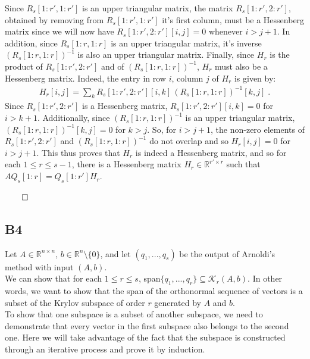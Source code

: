 \documentclass[a4paper,10pt]{article}
\begin{document}
Since $R_s[1:r',1:r']$ is an upper triangular matrix, the matrix $R_s[1:r',2:r']$, obtained by removing from $R_s[1:r',1:r']$ it's first column, must be a Hessenberg matrix since we will now have $R_s[1:r',2:r'][i,j] = 0$ whenever $i > j + 1$. In addition, since $R_s[1:r,1:r]$ is an upper triangular matrix, it's inverse $(R_s[1:r,1:r])^{-1}$ is also an upper triangular matrix. Finally, since $H_r$ is the product of $R_s[1:r',2:r']$ and of $(R_s[1:r,1:r])^{-1}$, $H_r$ must also be a Hessenberg matrix. Indeed, the entry in row $i$, column $j$ of $H_r$ is given by:
\begin{align*}
    H_r[i,j] = \sum_k R_s[1:r',2:r'][i,k] \, (R_s[1:r,1:r])^{-1}[k,j] \; .
\end{align*} 
Since $R_s[1:r',2:r']$ is a Hessenberg matrix, $R_s[1:r',2:r'][i,k] = 0$ for $i > k+1$. Additionally, since $(R_s[1:r,1:r])^{-1}$ is an upper triangular matrix, $(R_s[1:r,1:r])^{-1}[k,j] = 0$ for $k > j$. So, for $i > j+1$, the non-zero elements of $R_s[1:r',2:r']$ and $(R_s[1:r,1:r])^{-1}$ do not overlap and so $H_r[i,j] = 0$ for $i > j+1$. This thus proves that $H_r$ is indeed a Hessenberg matrix, and so for each $1 \leq r \leq s-1$, there is a Hessenberg matrix $H_r \in \mathbb{R}^{r' \times r}$ such that $A Q_s[1:r] = Q_s[1:r'] H_r$.
\begin{flushright}
    $\qed$
\end{flushright}


\subsection*{B4}
Let $A \in \mathbb{R}^{n \times n}$, $b \in \mathbb{R}^n \setminus \{0\}$, and let $(q_1,...,q_s)$ be the output of Arnoldi's method with input $(A,b)$.\\
We can show that for each $1\leq r \leq s$, span$\{q_1,...,q_r\} \subseteq \mathcal{K}_r(A,b)$. In other words, we want to show that the span of the orthonormal sequence of vectors is a subset of the Krylov subspace of order $r$ generated by $A$ and $b$.\\

To show that one subspace is a subset of another subspace, we need to demonstrate that every vector in the first subspace also belongs to the second one. Here we will take advantage of the fact that the subspace is constructed through an iterative process and prove it by induction.\\
\end{document}
